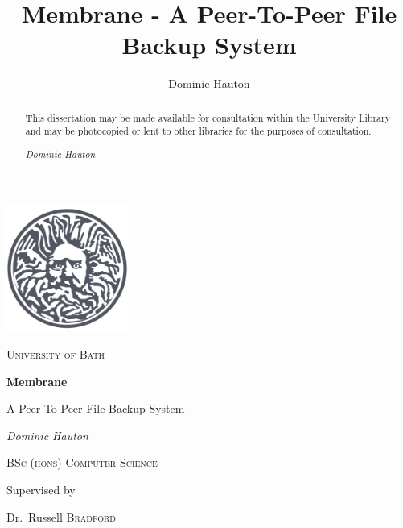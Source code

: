 \documentclass[11pt, a4paper, twoside]{report}
\title{Membrane - A Peer-To-Peer File Backup System}
\author{Dominic Hauton}
\begin{document}
\begin{titlepage}
	\centering
	\includegraphics[width=0.3\textwidth]{uob-logo}\par\vspace{0.5cm}
	{\scshape\LARGE University of Bath \par}
	\vspace{3cm}
	{\huge\bfseries Membrane\par A Peer-To-Peer File Backup System\par}
	\vspace{1cm}
	{\Large\itshape Dominic Hauton\par}
	\vspace{1cm}
	{\scshape\Large BSc (hons) Computer Science\par}
	\vfill
	Supervised by\par
	Dr.~Russell \textsc{Bradford}

	\vspace{1cm}

	{\large \the\year\par}
\end{titlepage}

\renewcommand{\abstractname}{}
\begin{abstract}
This dissertation may be made available for consultation within the University
Library and may be photocopied or lent to other libraries for the purposes of consultation.

\vspace{0.5cm}
\noindent
\emph{Dominic Hauton}
\end{abstract}
\end{document}
